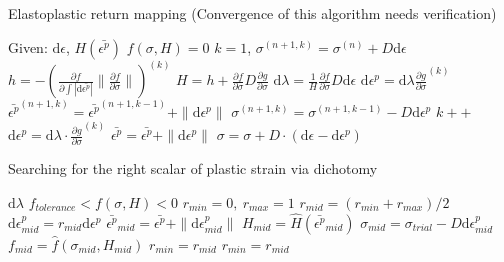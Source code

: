 \documentclass{article}
\begin{document}
	\begin{algorithm}	
	\begin{algorithmic}[1]
		\caption{Elastoplastic return mapping (Convergence of this algorithm needs verification)}
		\Require Given: $\mathrm{d} \epsilon$, $H(\bar{\epsilon^{p}})$
		\Ensure  $f(\sigma, H) = 0$		
		\State  $k=1$, $\sigma^{(n+1, k)}=\sigma^{(n)}+D\mathrm{d}\epsilon$ 
		  
		\State $h=-(\frac{\partial f}{\partial \int |\mathrm{d} \bar{\epsilon^{p}}|}\| \frac{\partial f}{\partial \sigma}\|)^{(k)}$
		\State $H=h+\frac{\partial f}{\partial \sigma} D \frac{\partial g}{\partial \sigma}$
		\State $ \mathrm{d}\lambda=\frac{1}{H} \frac{\partial f}{\partial \sigma} D \mathrm{d} \epsilon $
		\State $\mathrm{d}\epsilon^p = \mathrm{d}\lambda \frac{\partial g}{\partial \sigma}^{(k)} $
		\State $\bar{\epsilon^{p}}^{(n+1, k)} = \bar{\epsilon^{p}}^{(n+1, k-1)} + \| \mathrm{d}\epsilon^p \| $
		\State $\sigma^{(n+1, k)}= \sigma^{(n+1, k-1)} - D\mathrm{d}\epsilon^p$
		\State $k++$
		\EndWhile
		 
		\State {}
		\EndIf
		\State $\mathrm{d}\epsilon^{p} = \mathrm{d} \lambda \cdot \frac{\partial g}{\partial \sigma}^{(k)} $
		\State $\bar{\epsilon^{p}} = \bar{\epsilon^{p}} + \| \mathrm{d}\epsilon^{p} \| $
		\State $\sigma = \sigma + D \cdot(\mathrm{d}\epsilon - \mathrm{d}\epsilon^{p} )$
		\State \Return{$\sigma$} 
	\end{algorithmic}
\end{algorithm}

	\begin{algorithm}	
	\begin{algorithmic}[1]
		\caption{Searching for the right scalar of plastic strain via dichotomy}
		\Require $\mathrm{d}\lambda$
		\Ensure  $f_{tolerance} < f(\sigma, H) < 0$		
		\State $r_{min}=0,\  r_{max}=1$
		\State $r_{mid}=(r_{min}+r_{max})/2$
		\State $ \mathrm{d}\epsilon^p_{mid} = r_{mid} \mathrm{d}\epsilon^p$
		\State $\bar{\epsilon^{p}}_{mid} = \bar{\epsilon^{p}} + \| \mathrm{d}\epsilon^p_{mid} \|$
		\State $H_{mid} = \hat{H}(\bar{\epsilon^{p}}_{mid})$
		\State $\sigma_{mid}= \sigma_{trial} - D  \mathrm{d}\epsilon^p_{mid}$
		\State $f_{mid}=\hat{f}(\sigma_{mid}, H_{mid})$
		\State $r_{min} = r_{mid}$
		\Else
		 \State $r_{min} = r_{mid}$
		\EndIf
		\EndWhile
		\State {} 
	\end{algorithmic}
\end{algorithm}
\end{document}
